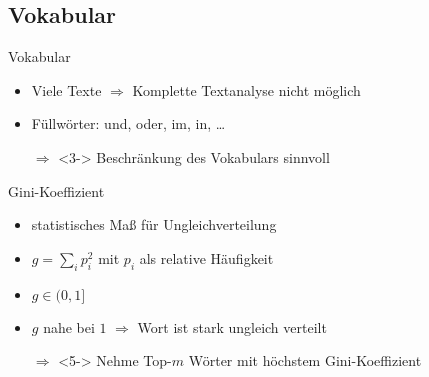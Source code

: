 \subsection{Vokabular}
\begin{frame}{Vokabular}
    \begin{itemize}
        \item<1-> Viele Texte $\Rightarrow$ Komplette Textanalyse nicht möglich
        \item<2-> Füllwörter: und, oder, im, in, \dots
        \item[$\Rightarrow$]<3-> Beschränkung des Vokabulars sinnvoll
    \end{itemize}

\end{frame}

\begin{frame}{Gini-Koeffizient}
    \begin{itemize}
        \item<1-> statistisches Maß für Ungleichverteilung
        \item<2-> $g = \sum_i p_i^2$ mit $p_i$ als relative Häufigkeit
        \item<3-> $g \in (0, 1]$
        \item<4-> $g$ nahe bei $1$ $\Rightarrow$ Wort ist stark ungleich verteilt
        \item[$\Rightarrow$]<5-> Nehme Top-$m$ Wörter mit höchstem
                  Gini-Koeffizient
    \end{itemize}
\end{frame}
